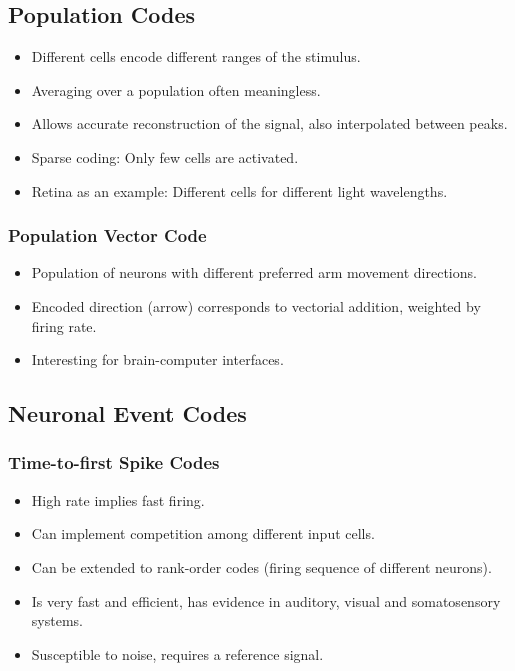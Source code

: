 \documentclass[main]{subfiles}
\begin{document}
\subsection{Population Codes}
\begin{itemize}[noitemsep,nolistsep]
	\item Different cells encode different ranges of the stimulus.
	\item Averaging over a population often meaningless.
	\item Allows accurate reconstruction of the signal, also interpolated between peaks.
	\item Sparse coding: Only few cells are activated.
	\item Retina as an example: Different cells for different light wavelengths.
\end{itemize}

\subsubsection{Population Vector Code}
\begin{itemize}[noitemsep,nolistsep]
	\item Population of neurons with different preferred arm movement directions.
	\item Encoded direction (arrow) corresponds to vectorial addition, weighted by firing rate.
	\item Interesting for brain-computer interfaces.
\end{itemize}

\subsection{Neuronal Event Codes}
\subsubsection{Time-to-first Spike Codes}
\begin{itemize}[noitemsep,nolistsep]
	\item High rate implies fast firing.
	\item Can implement competition among different input cells.
	\item Can be extended to rank-order codes (firing sequence of different neurons).
	\item Is very fast and efficient, has evidence in auditory, visual and somatosensory systems.
	\item Susceptible to noise, requires a reference signal.
\end{itemize}
\end{document}
